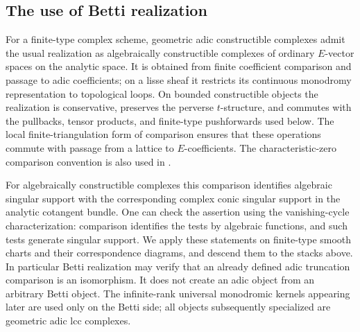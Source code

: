 \subsection{The use of Betti realization}

For a finite-type complex scheme, geometric adic constructible complexes
admit the usual realization as algebraically constructible complexes of
ordinary $E$-vector spaces on the analytic space.  It is obtained from
finite coefficient comparison and passage to adic coefficients; on a
lisse sheaf it restricts its continuous monodromy representation to
topological loops.  On bounded constructible objects the realization is
conservative, preserves the perverse $t$-structure, and commutes with the
pullbacks, tensor products, and finite-type pushforwards used below.  The
local finite-triangulation form of comparison ensures that these
operations commute with passage from a lattice to $E$-coefficients.
The characteristic-zero comparison convention is also used in
\cite[\S2.2.1]{GR}.

For algebraically constructible complexes this comparison identifies
algebraic singular support with the corresponding complex conic singular
support in the analytic cotangent bundle.  One can check the assertion
using the vanishing-cycle characterization: comparison identifies the
tests by algebraic functions, and such tests generate singular support.
We apply these statements on finite-type smooth charts and their
correspondence diagrams, and descend them to the stacks above.  In
particular Betti realization may verify that an already defined adic
truncation comparison is an isomorphism.  It does not create an adic
object from an arbitrary Betti object.  The infinite-rank universal
monodromic kernels appearing later are used only on the Betti side; all
objects subsequently specialized are geometric adic lcc complexes.
